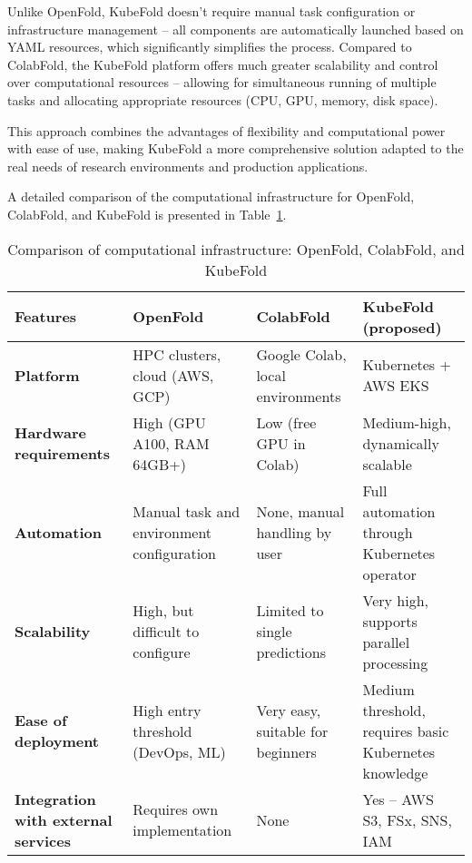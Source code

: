 Unlike OpenFold, KubeFold doesn't require manual task configuration or infrastructure management – all components are automatically launched based on YAML resources, which significantly simplifies the process.
Compared to ColabFold, the KubeFold platform offers much greater scalability and control over computational resources – allowing for simultaneous running of multiple tasks and allocating appropriate resources (CPU, GPU, memory, disk space).

This approach combines the advantages of flexibility and computational power with ease of use, making KubeFold a more comprehensive solution adapted to the real needs of research environments and production applications.

A detailed comparison of the computational infrastructure for OpenFold, ColabFold, and KubeFold is presented in Table~\ref{tab:comparison}.

\begin{table}[H]
    \centering
    \small
    \begin{tabularx}{\textwidth}{|X|X|X|X|}
        \hline
        \textbf{Features}                           & \textbf{OpenFold}                         & \textbf{ColabFold}                & \textbf{KubeFold (proposed)}                          \\
        \hline
        \textbf{Platform}                           & HPC clusters, cloud (AWS, GCP)            & Google Colab, local environments & Kubernetes + AWS EKS \\
        \hline
        \textbf{Hardware requirements}              & High (GPU A100, RAM 64GB+)                & Low (free GPU in Colab) & Medium-high, dynamically scalable \\
        \hline
        \textbf{Automation}                         & Manual task and environment configuration & None, manual handling by user & Full automation through Kubernetes operator \\
        \hline
        \textbf{Scalability}                        & High, but difficult to configure          & Limited to single predictions & Very high, supports parallel processing \\
        \hline
        \textbf{Ease of deployment}                 & High entry threshold (DevOps, ML)         & Very easy, suitable for beginners & Medium threshold, requires basic Kubernetes knowledge \\
        \hline
        \textbf{Integration with external services} & Requires own implementation               & None                              & Yes – AWS S3, FSx, SNS, IAM                           \\
        \hline
    \end{tabularx}
    \caption{Comparison of computational infrastructure: OpenFold, ColabFold, and KubeFold}
    \label{tab:comparison}
\end{table}

